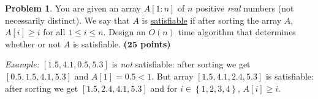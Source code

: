 \documentclass{article}
\theoremstyle{definition}
\newtheorem{problem}{Problem}
\newcommand{\grade}[1]{\hfill{\textbf{($\mathbf{#1}$ points)}}}
\newcommand{\set}[1]{\ensuremath{\left\{ #1 \right\}}}
\begin{document}
\smallskip


\begin{problem}
	You are given an array $A[1:n]$ of $n$ positive \emph{real} numbers (not necessarily distinct). We say that $A$ is \underline{satisfiable} if after sorting the array $A$, $A[i] \geq i$ for all $1 \leq i \leq n$. 
	Design an $O(n)$ time algorithm that determines whether or not $A$ is satisfiable. \grade{25}
	
	\emph{Example:} $[1.5,4.1,0.5,5.3]$ is \emph{not} satisfiable: after sorting  we get $[0.5,1.5,4.1,5.3]$ and $A[1] = 0.5 < 1$. But array $[1.5,4.1,2.4,5.3]$ is satisfiable:
	 after sorting  we get $[1.5,2.4,4.1,5.3]$ and for $i \in \set{1,2,3,4}$, $A[i] \geq i$. 
	
\end{problem}

\smallskip
\end{document}
